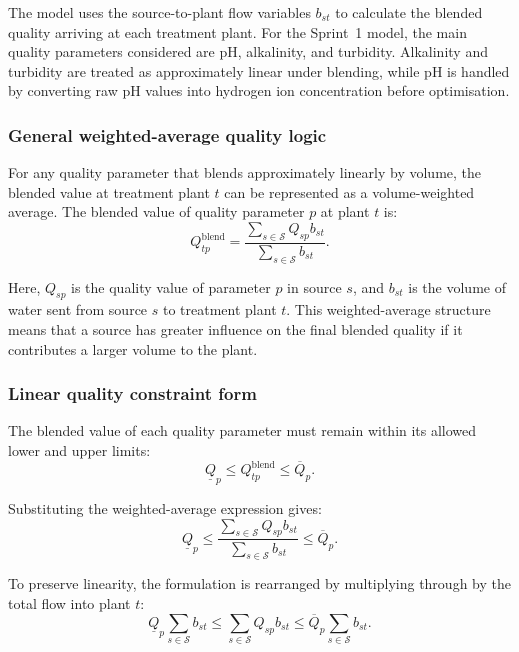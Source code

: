 \documentclass[10pt]{article}
\begin{document}
The model uses the source-to-plant flow variables $b_{st}$ to calculate the
blended quality arriving at each treatment plant. For the Sprint~1 model, the
main quality parameters considered are pH, alkalinity, and turbidity. Alkalinity
and turbidity are treated as approximately linear under blending, while pH is
handled by converting raw pH values into hydrogen ion concentration before
optimisation.

\subsubsection{General weighted-average quality logic}

For any quality parameter that blends approximately linearly by volume, the
blended value at treatment plant $t$ can be represented as a volume-weighted
average. The blended value of quality parameter $p$ at plant $t$ is:
\begin{equation}
    Q^{\mathrm{blend}}_{tp}
    =
    \frac{
    \sum_{s \in \mathcal{S}} Q_{sp} b_{st}
    }{
    \sum_{s \in \mathcal{S}} b_{st}
    }.
\end{equation}

Here, $Q_{sp}$ is the quality value of parameter $p$ in source $s$, and $b_{st}$
is the volume of water sent from source $s$ to treatment plant $t$. This
weighted-average structure means that a source has greater influence on the
final blended quality if it contributes a larger volume to the plant.

\subsubsection{Linear quality constraint form}

The blended value of each quality parameter must remain within its allowed lower
and upper limits:
\begin{equation}
    \underline{Q}_p
    \leq
    Q^{\mathrm{blend}}_{tp}
    \leq
    \overline{Q}_p.
\end{equation}

Substituting the weighted-average expression gives:
\begin{equation}
    \underline{Q}_p
    \leq
    \frac{
    \sum_{s \in \mathcal{S}} Q_{sp} b_{st}
    }{
    \sum_{s \in \mathcal{S}} b_{st}
    }
    \leq
    \overline{Q}_p.
\end{equation}

To preserve linearity, the formulation is rearranged by multiplying through by
the total flow into plant $t$:
\begin{equation}
    \underline{Q}_p
    \sum_{s \in \mathcal{S}} b_{st}
    \leq
    \sum_{s \in \mathcal{S}} Q_{sp} b_{st}
    \leq
    \overline{Q}_p
    \sum_{s \in \mathcal{S}} b_{st}.
\end{equation}
\end{document}
